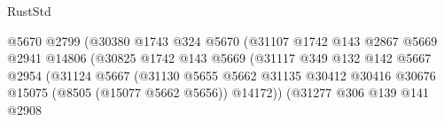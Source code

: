 \begin{lexlean}{RustStd}
\begin{coremodule}
                                                    @5670
                                                    @2799
                                                    (@30380
                                                      @1743
                                                      @324
                                                      @5670
                                                      (@31107
                                                        @1742
                                                        @143
                                                        @2867
                                                        @5669
                                                        @2941
                                                        @14806
                                                        (@30825
                                                          @1742
                                                          @143
                                                          @5669
                                                          (@31117
                                                            @349
                                                            @132
                                                            @142
                                                            @5667
                                                            @2954
                                                            (@31124
                                                              @5667
                                                              (@31130
                                                                @5655
                                                                @5662
                                                                @31135
                                                                @30412
                                                                @30416
                                                                @30676
                                                                @15075
                                                                (@8505 (@15077 @5662 @5656))
                                                                @14172))
                                                            (@31277
                                                              @306
                                                              @139
                                                              @141
                                                              @2908

\end{coremodule}
\end{lexlean}
